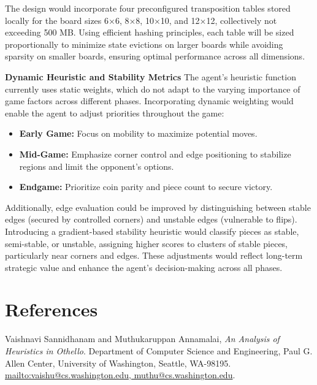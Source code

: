 \documentclass[11pt]{article}
\begin{document}
The design would incorporate four preconfigured transposition tables stored locally for the board sizes 6×6, 8×8, 10×10, and 12×12, collectively not exceeding 500 MB. Using efficient hashing principles, each table will be sized proportionally to minimize state evictions on larger boards while avoiding sparsity on smaller boards, ensuring optimal performance across all dimensions.

\noindent \textbf{Dynamic Heuristic and Stability Metrics}  
The agent's heuristic function currently uses static weights, which do not adapt to the varying importance of game factors across different phases. Incorporating dynamic weighting would enable the agent to adjust priorities throughout the game:  
\begin{itemize}
    \item \textbf{Early Game:} Focus on mobility to maximize potential moves.
    \item \textbf{Mid-Game:} Emphasize corner control and edge positioning to stabilize regions and limit the opponent’s options.
    \item \textbf{Endgame:} Prioritize coin parity and piece count to secure victory.
\end{itemize}

Additionally, edge evaluation could be improved by distinguishing between stable edges (secured by controlled corners) and unstable edges (vulnerable to flips). Introducing a gradient-based stability heuristic would classify pieces as stable, semi-stable, or unstable, assigning higher scores to clusters of stable pieces, particularly near corners and edges. These adjustments would reflect long-term strategic value and enhance the agent’s decision-making across all phases.

\section*{References}
\begin{thebibliography}{9}

Vaishnavi Sannidhanam and Muthukaruppan Annamalai, 
\emph{An Analysis of Heuristics in Othello}. 
Department of Computer Science and Engineering, Paul G. Allen Center, University of Washington, Seattle, WA-98195. \url{mailto:vaishu@cs.washington.edu, muthu@cs.washington.edu}.

\end{thebibliography}
\end{document}
